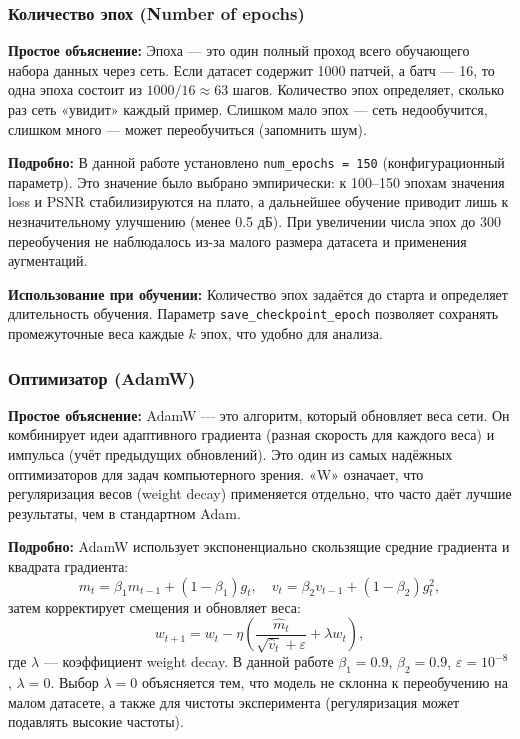 \documentclass[12pt,a4paper]{article}
\begin{document}
\subsubsection{Количество эпох (Number of epochs)}

\textbf{Простое объяснение:}  
Эпоха — это один полный проход всего обучающего набора данных через сеть. Если датасет содержит 1000 патчей, а батч — 16, то одна эпоха состоит из \(1000/16 \approx 63\) шагов. Количество эпох определяет, сколько раз сеть «увидит» каждый пример. Слишком мало эпох — сеть недообучится, слишком много — может переобучиться (запомнить шум).

\textbf{Подробно:}  
В данной работе установлено \texttt{num\_epochs = 150} (конфигурационный параметр). Это значение было выбрано эмпирически: к 100–150 эпохам значения loss и PSNR стабилизируются на плато, а дальнейшее обучение приводит лишь к незначительному улучшению (менее 0.5 дБ). При увеличении числа эпох до 300 переобучения не наблюдалось из-за малого размера датасета и применения аугментаций.

\textbf{Использование при обучении:}  
Количество эпох задаётся до старта и определяет длительность обучения. Параметр \texttt{save\_checkpoint\_epoch} позволяет сохранять промежуточные веса каждые \(k\) эпох, что удобно для анализа.

\subsubsection{Оптимизатор (AdamW)}

\textbf{Простое объяснение:}  
AdamW — это алгоритм, который обновляет веса сети. Он комбинирует идеи адаптивного градиента (разная скорость для каждого веса) и импульса (учёт предыдущих обновлений). Это один из самых надёжных оптимизаторов для задач компьютерного зрения. «W» означает, что регуляризация весов (weight decay) применяется отдельно, что часто даёт лучшие результаты, чем в стандартном Adam.

\textbf{Подробно:}  
AdamW использует экспоненциально скользящие средние градиента и квадрата градиента:
\[
m_t = \beta_1 m_{t-1} + (1-\beta_1) g_t, \quad v_t = \beta_2 v_{t-1} + (1-\beta_2) g_t^2,
\]
затем корректирует смещения и обновляет веса:
\[
w_{t+1} = w_t - \eta \left( \frac{\hat{m}_t}{\sqrt{\hat{v}_t}+\varepsilon} + \lambda w_t \right),
\]
где \(\lambda\) — коэффициент weight decay. В данной работе \(\beta_1 = 0.9\), \(\beta_2 = 0.9\), \(\varepsilon = 10^{-8}\), \(\lambda = 0\). Выбор \(\lambda=0\) объясняется тем, что модель не склонна к переобучению на малом датасете, а также для чистоты эксперимента (регуляризация может подавлять высокие частоты).
\end{document}

